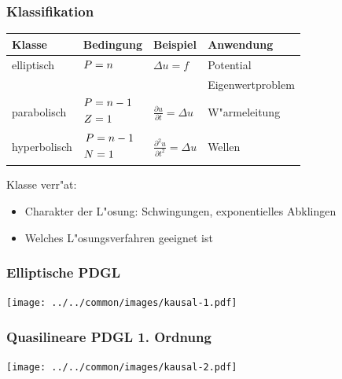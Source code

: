 
\begin{frame}
\frametitle{Klassifikation}

\begin{center}
\begin{tabular}{llll}
Klasse&Bedingung&Beispiel&Anwendung\\
\hline
elliptisch &$\begin{aligned}P&=n\mathstrut\end{aligned}$
	&$\displaystyle \Delta u=f                                $
		&Potential\\
&	&	&Eigenwertproblem\\
\hline
parabolisch&%
$\begin{aligned}P&=n-1\mathstrut\\Z&=1\mathstrut\end{aligned}$
	&$\displaystyle \frac{\partial u}{\partial t}=\Delta u    $
		&W"armeleitung\\
\hline
hyperbolisch&%
$\begin{aligned}P&=n-1\mathstrut\\N&=1\mathstrut\end{aligned}$
	&$\displaystyle \frac{\partial^2 u}{\partial t^2}=\Delta u$
		&Wellen\\
\hline
\end{tabular}
\end{center}

Klasse verr"at:
\begin{itemize}
\item Charakter der L"osung: Schwingungen, exponentielles Abklingen
\item Welches L"osungsverfahren geeignet ist
\end{itemize}

\end{frame}

\begin{frame}
\frametitle{Elliptische PDGL}
\begin{center}
\texttt{[image: ../../common/images/kausal-1.pdf]}
\end{center}
\end{frame}

\begin{frame}
\frametitle{Quasilineare PDGL 1. Ordnung}
\begin{center}
\texttt{[image: ../../common/images/kausal-2.pdf]}
\end{center}
\end{frame}

